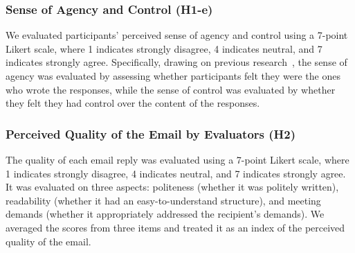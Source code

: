 \subsubsection{Sense of Agency and Control (H1-e)}
We evaluated participants' perceived sense of agency and control using a 7-point Likert scale, where 1 indicates strongly disagree, 4 indicates neutral, and 7 indicates strongly agree.
Specifically, drawing on previous research~\cite{Fu2023Comparing, Draxler2024The}, the sense of agency was evaluated by assessing whether participants felt they were the ones who wrote the responses, while the sense of control was evaluated by whether they felt they had control over the content of the responses. 

\subsubsection{Perceived Quality of the Email by Evaluators (H2)}
\label{sec:method2_H2}
The quality of each email reply was evaluated  using a 7-point Likert scale, where 1 indicates strongly disagree, 4 indicates neutral, and 7 indicates strongly agree.
It was evaluated on three aspects: politeness (whether it was politely written), readability (whether it had an easy-to-understand structure), and meeting demands (whether it appropriately addressed the recipient's demands). 
We averaged the scores from three items and treated it as an index of the perceived quality of the email.

\subsubsection{}

